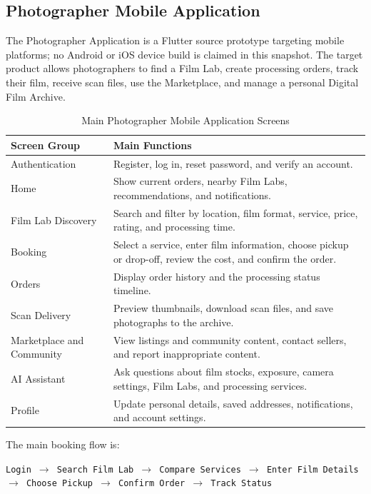 \subsection{Photographer Mobile Application}

The Photographer Application is a Flutter source prototype targeting mobile
platforms; no Android or iOS device build is claimed in this snapshot.
The target product allows photographers to find a Film Lab, create processing orders, track
their film, receive scan files, use the Marketplace, and manage a personal
Digital Film Archive.

\begin{table}[htbp]
\centering
\small
\renewcommand{\arraystretch}{1.1}
\caption{Main Photographer Mobile Application Screens}
\label{tab:photographer-mobile-screens}
\begin{tabular}{|p{3.4cm}|p{9.2cm}|}
\hline
\textbf{Screen Group} & \textbf{Main Functions} \\
\hline
Authentication & Register, log in, reset password, and verify an account. \\
\hline
Home & Show current orders, nearby Film Labs, recommendations, and
notifications. \\
\hline
Film Lab Discovery & Search and filter by location, film format, service,
price, rating, and processing time. \\
\hline
Booking & Select a service, enter film information, choose pickup or drop-off,
review the cost, and confirm the order. \\
\hline
Orders & Display order history and the processing status timeline. \\
\hline
Scan Delivery & Preview thumbnails, download scan files, and save photographs
to the archive. \\
\hline
Marketplace and Community & View listings and community content, contact
sellers, and report inappropriate content. \\
\hline
AI Assistant & Ask questions about film stocks, exposure, camera settings,
Film Labs, and processing services. \\
\hline
Profile & Update personal details, saved addresses, notifications, and account
settings. \\
\hline
\end{tabular}
\end{table}

The main booking flow is:

\begin{center}
\texttt{Login $\rightarrow$ Search Film Lab $\rightarrow$ Compare Services
$\rightarrow$ Enter Film Details $\rightarrow$ Choose Pickup
$\rightarrow$ Confirm Order $\rightarrow$ Track Status}
\end{center}

